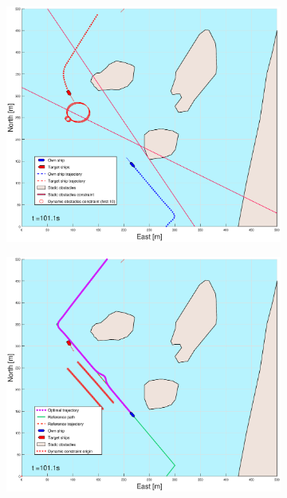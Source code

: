 \begin{figure}[ht]\ContinuedFloat
    \begin{subfigure}[b]{0.49\textwidth}
        \centering
        \includegraphics[width=\textwidth]{Images/Figures/Helloya/_Simple_0fig1_time=101}
    \end{subfigure}
    \hfill
    \begin{subfigure}[b]{0.499\textwidth}
        \centering
        \includegraphics[width=\textwidth]{Images/Figures/Helloya/_Simple_0fig999_time=101}

\end{subfigure}
\end{figure}
